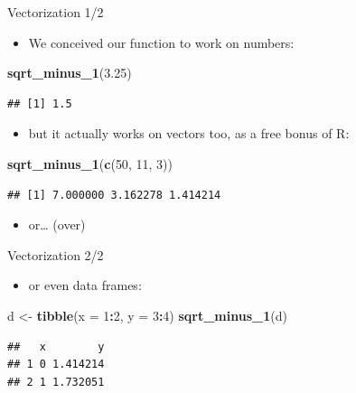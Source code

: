 \documentclass[
  ignorenonframetext,
]{beamer}
\newenvironment{Shaded}{\begin{snugshade}}{\end{snugshade}}
\newcommand{\DataTypeTok}[1]{\textcolor[rgb]{0.13,0.29,0.53}{#1}}
\newcommand{\DecValTok}[1]{\textcolor[rgb]{0.00,0.00,0.81}{#1}}
\newcommand{\FloatTok}[1]{\textcolor[rgb]{0.00,0.00,0.81}{#1}}
\newcommand{\KeywordTok}[1]{\textcolor[rgb]{0.13,0.29,0.53}{\textbf{#1}}}
\newcommand{\NormalTok}[1]{#1}
\newcommand{\OperatorTok}[1]{\textcolor[rgb]{0.81,0.36,0.00}{\textbf{#1}}}
\newcommand{\StringTok}[1]{\textcolor[rgb]{0.31,0.60,0.02}{#1}}
\providecommand{\tightlist}{%
  \setlength{\itemsep}{0pt}\setlength{\parskip}{0pt}}
\begin{document}
\begin{frame}[fragile]{Vectorization 1/2}
\protect\hypertarget{vectorization-12}{}

\begin{itemize}
\tightlist
\item
  We conceived our function to work on numbers:
\end{itemize}

\begin{Shaded}
\begin{Highlighting}[]
\KeywordTok{sqrt_minus_1}\NormalTok{(}\FloatTok{3.25}\NormalTok{)}
\end{Highlighting}
\end{Shaded}

\begin{verbatim}
## [1] 1.5
\end{verbatim}

\begin{itemize}
\tightlist
\item
  but it actually works on vectors too, as a free bonus of R:
\end{itemize}

\begin{Shaded}
\begin{Highlighting}[]
\KeywordTok{sqrt_minus_1}\NormalTok{(}\KeywordTok{c}\NormalTok{(}\DecValTok{50}\NormalTok{, }\DecValTok{11}\NormalTok{, }\DecValTok{3}\NormalTok{))}
\end{Highlighting}
\end{Shaded}

\begin{verbatim}
## [1] 7.000000 3.162278 1.414214
\end{verbatim}

\begin{itemize}
\tightlist
\item
  or\ldots{} (over)
\end{itemize}

\end{frame}

\begin{frame}[fragile]{Vectorization 2/2}
\protect\hypertarget{vectorization-22}{}

\begin{itemize}
\tightlist
\item
  or even data frames:
\end{itemize}

\begin{Shaded}
\begin{Highlighting}[]
\NormalTok{d <-}\StringTok{ }\KeywordTok{tibble}\NormalTok{(}\DataTypeTok{x =} \DecValTok{1}\OperatorTok{:}\DecValTok{2}\NormalTok{, }\DataTypeTok{y =} \DecValTok{3}\OperatorTok{:}\DecValTok{4}\NormalTok{)}
\KeywordTok{sqrt_minus_1}\NormalTok{(d)}
\end{Highlighting}
\end{Shaded}

\begin{verbatim}
##   x        y
## 1 0 1.414214
## 2 1 1.732051
\end{verbatim}

\end{frame}
\end{document}
